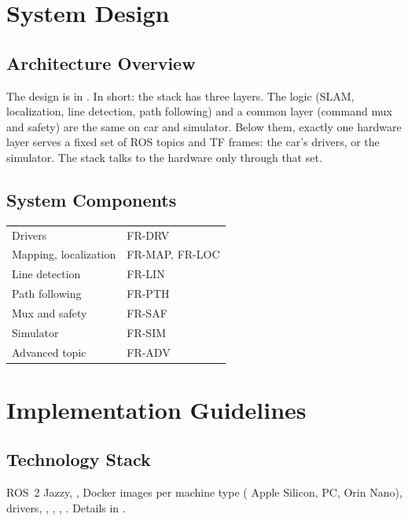 \documentclass[11pt,a4paper]{article}
\begin{document}
\section{System Design}
\subsection{Architecture Overview}
The design is in . In short: the stack has three layers. The logic (SLAM, localization, line detection, path following) and a common layer (command mux and safety) are the same on car and simulator. Below them, exactly one hardware layer serves a fixed set of ROS topics and TF frames: the car's drivers, or the simulator. The stack talks to the hardware only through that set.

\subsection{System Components}
\begin{tabularx}{\textwidth}{@{}L{3.5cm} Y@{}}
\toprule
{} &  \\
\midrule
Drivers & FR-DRV \\
Mapping, localization & FR-MAP, FR-LOC \\
Line detection & FR-LIN \\
Path following & FR-PTH \\
Mux and safety & FR-SAF \\
Simulator & FR-SIM \\
Advanced topic & FR-ADV \\
\bottomrule
\end{tabularx}

\section{Implementation Guidelines}
\subsection{Technology Stack}
ROS~2 Jazzy, , Docker images per machine type ( Apple Silicon,  PC,  Orin Nano),  drivers, , , , . Details in .
\end{document}
